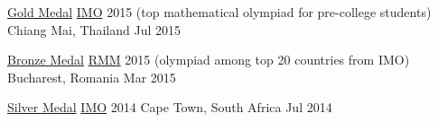 \begin{cvhonors}

\cvhonor
{\href{https://www.imo-official.org/participant_r.aspx?id=25121}{Gold Medal}}
{\href{https://en.wikipedia.org/wiki/International_Mathematical_Olympiad}{IMO} 2015 (top mathematical olympiad for pre-college students)}
{Chiang Mai, Thailand}
{Jul 2015}


\cvhonor
{\href{http://rmms.lbi.ro/rmm2015/index.php?id=results_math}{Bronze Medal}}
{\href{https://en.wikipedia.org/wiki/Romanian_Master_of_Mathematics_and_Sciences}{RMM} 2015 (olympiad among top 20 countries from IMO)}
{Bucharest, Romania}
{Mar 2015}


\cvhonor
{\href{https://www.imo-official.org/participant_r.aspx?id=25121}{Silver Medal}}
{\href{https://en.wikipedia.org/wiki/International_Mathematical_Olympiad}{IMO} 2014}
{Cape Town, South Africa}
{Jul 2014}


\end{cvhonors}




